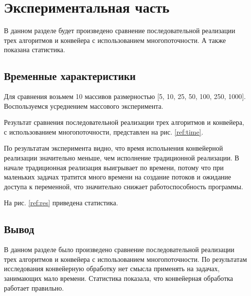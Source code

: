 \chapter{Экспериментальная часть}

В данном разделе будет произведено сравнение
последовательной реализации трех алгоритмов
и конвейера с использованием многопоточности. А также показана статистика.

\section{Временные характеристики}

Для сравнения возьмем 10 массивов размерностью
$[$5, 10, 25, 50, 100, 250, 1000$]$.
Воспользуемся усреднением массового эксперимента.

Результат сравнения последовательной реализации трех алгоритмов
и конвейера, с использованием многопоточности, представлен на рис. \ref{ref:time}.

\begin{figure}[ht!]
\end{figure}

По результатам эксперимента видно, что время испольнения конвейерной
реализации значительно меньше, чем исполнение традиционной реализации.
В начале традиционная реализация выигрывает по времени, потому что
при маленьких задачах тратится много времени на создание потоков и
ожидание доступа к переменной, что значительно снижает
работоспособность программы.

На рис. \ref{ref:res} приведена статистика.

\begin{figure}[ht!]
\end{figure}

\section{Вывод}

В данном разделе было произведено сравнение
последовательной реализации трех алгоритмов
и конвейера с использованием многопоточности.
По результатам исследования конвейерную обработку
нет смысла применять на задачах, занимающих мало времени.
Статистика показала, что конвейерная обработка работает правильно.